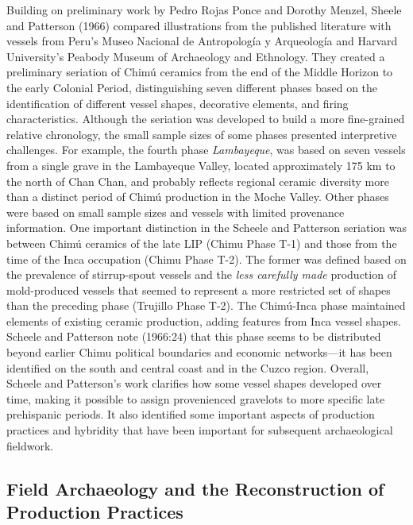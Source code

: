 \documentclass[]{interact}
\theoremstyle{plain}%
\theoremstyle{definition}
\theoremstyle{remark}
\begin{document}
Building on preliminary work by Pedro Rojas Ponce and Dorothy Menzel,
Sheele and Patterson (1966) compared illustrations from the published
literature with vessels from Peru's Museo Nacional de Antropología y
Arqueología and Harvard University's Peabody Museum of Archaeology and
Ethnology. They created a preliminary seriation of Chimú ceramics from
the end of the Middle Horizon to the early Colonial Period,
distinguishing seven different phases based on the identification of
different vessel shapes, decorative elements, and firing
characteristics. Although the seriation was developed to build a more
fine-grained relative chronology, the small sample sizes of some phases
presented interpretive challenges. For example, the fourth phase
\emph{Lambayeque}, was based on seven vessels from a single grave in the
Lambayeque Valley, located approximately 175 km to the north of Chan
Chan, and probably reflects regional ceramic diversity more than a
distinct period of Chimú production in the Moche Valley. Other phases
were based on small sample sizes and vessels with limited provenance
information. One important distinction in the Scheele and Patterson
seriation was between Chimú ceramics of the late LIP (Chimu Phase T-1)
and those from the time of the Inca occupation (Chimu Phase T-2). The
former was defined based on the prevalence of stirrup-spout vessels and
the \emph{less carefully made} production of mold-produced vessels that
seemed to represent a more restricted set of shapes than the preceding
phase (Trujillo Phase T-2). The Chimú-Inca phase maintained elements of
existing ceramic production, adding features from Inca vessel shapes.
Scheele and Patterson note (1966:24) that this phase seems to be
distributed beyond earlier Chimu political boundaries and economic
networks---it has been identified on the south and central coast and in
the Cuzco region. Overall, Scheele and Patterson's work clarifies how
some vessel shapes developed over time, making it possible to assign
provenienced gravelots to more specific late prehispanic periods. It
also identified some important aspects of production practices and
hybridity that have been important for subsequent archaeological
fieldwork.

\hypertarget{field-archaeology-and-the-reconstruction-of-production-practices}{%
\subsection{Field Archaeology and the Reconstruction of Production
Practices}\label{field-archaeology-and-the-reconstruction-of-production-practices}}
\end{document}
